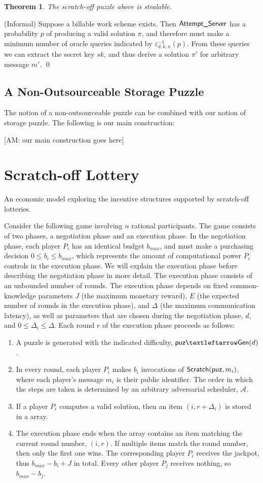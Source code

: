 \documentclass[]{article}
\newcommand{\anote}[1]{{\color{magenta}[AM: #1]}}
\newtheorem{theorem}{Theorem}
\theoremstyle{remark}
\newcommand{\Adv}{\mathcal{A}}
\newcommand{\unn}[1]{\textnormal{\textsf{#1}}}
\newcommand{\puz}{\textnormal{\textsf{puz}}}
\begin{document}
\begin{theorem}
The scratch-off puzzle above is {\em stealable}.
\end{theorem}
\proof
(Informal) Suppose a billable work scheme exists. Then $\unn{Attempt\_Server}$ has a probability $p$ of producing a valid solution $π$, and therefore must make a minimum number of oracle queries indicated by $ε^{-1}_{d,k,n}(p)$. From these queries we can extract the secret key $sk$, and thus derive a solution $π'$ for arbitrary message $m'$.  \qed

\subsection{A Non-Outsourceable Storage Puzzle}

The notion of a non-outsourceable puzzle can be combined with our notion of storage puzzle. The following is our main construction:

\anote{our main construction goes here}


\section{Scratch-off Lottery}
An economic model exploring the incentive structures supported by scratch-off lotteries.

Consider the following game involving $n$ rational participants. The game consists of two phases, a negotiation phase and an execution phase. In the negotiation phase, each player $P_i$ has an identical budget $b_{max}$, and must make a purchasing decision $0 ≤ b_i ≤ b_{max}$, which represents the amount of computational power $P_i$ controls in the execution phase. We will explain the execution phase before describing the negotiation phase in more detail. The execution phase consists of an unbounded number of rounds. The execution phase depends on fixed common-knowledge parameters $J$ (the maximum monetary reward), $E$ (the expected number of rounds in the execution phase), and $Δ$ (the maximum communication latency), as well as parameters that are chosen during the negotiation phase, $d$, and $0 ≤ Δ_i ≤ Δ$. Each round $r$ of the execution phase proceeds as follows:
\begin{enumerate}
\item A puzzle is generated with the indicated difficulty, $\puz ← \unn{Gen}(d)$.
\item In every round, each player $P_i$ makes $b_i$ invocations of $\unn{Scratch}(\puz,m_i)$, where each player's message $m_i$ is their public identifier. The order in which the steps are taken is determined by an arbitrary adversarial scheduler, $\Adv$.
\item If a player $P_i$ computes a valid solution, then an item $(i,r+Δ_i)$ is stored in a array.
\item The execution phase ends when the array contains an item matching the current round number, $(i,r)$. If multiple items match the round number, then only the first one wins. The corresponding player $P_i$ receives the jackpot, thus $b_{max}-b_i+J$ in total. Every other player $P_j$ receives nothing, so $b_{max}-b_j$.
\end{enumerate}
\end{document}
